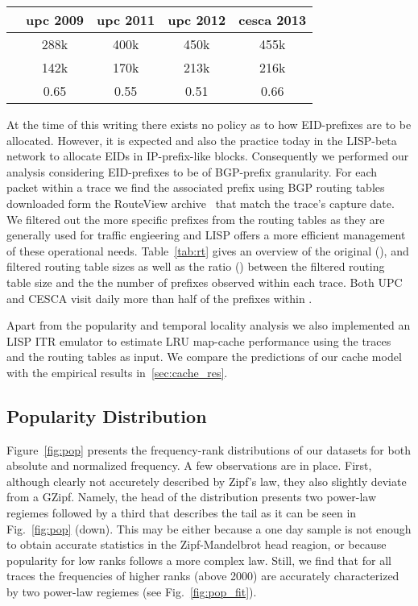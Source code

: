 \documentclass[twocolumn, 10pt]{article}
\theoremstyle{plain}
\begin{document}
\begin{table*}[t]
    \centering
    \caption{Routing Tables Statistics}
    \label{tab:rt}
    \begin{tabular}{lcccc}
        \toprule
        & \textbf{upc 2009} & \textbf{upc 2011} & \textbf{upc 2012} & \textbf{cesca 2013} \\ \midrule[0.09em]
         & 288k & 400k & 450k & 455k \\ \midrule
         & 142k & 170k & 213k & 216k \\ \midrule
         & 0.65 & 0.55 & 0.51 & 0.66 \\
        \bottomrule
    \end{tabular}
\end{table*}

At the time of this writing there exists no policy as to how EID-prefixes are
to be allocated. However, it is expected and also the practice today in the
LISP-beta network to allocate EIDs in IP-prefix-like blocks. Consequently we
performed our analysis considering EID-prefixes to be of BGP-prefix granularity. For each
packet within a trace we find the associated prefix using BGP routing tables
downloaded form the RouteView archive~\cite{routeviews} that match the trace's
capture date. We filtered out the more specific prefixes from the routing
tables as they are generally used for traffic engieering and LISP offers a
more efficient management of these operational needs. Table~\ref{tab:rt} gives
an overview of the original (), and filtered
 routing table sizes as well as the ratio () between the
filtered routing table size and the the number of prefixes observed within
each trace. Both UPC and CESCA visit daily more than half of the prefixes
within . 


Apart from the popularity and temporal locality analysis we also implemented
an LISP ITR emulator to estimate LRU map-cache performance using the traces and
the routing tables as input. We compare the predictions of our
cache model with the empirical results in~\ref{sec:cache_res}.

\subsection{Popularity Distribution}\label{sec:pop_assumption}

Figure~\ref{fig:pop} presents the frequency-rank distributions of our datasets
for both absolute and normalized frequency. A few observations are in
place. First, although clearly not accuretely described by Zipf's law, they
also slightly deviate from a GZipf. Namely, the head of the distribution
presents two power-law regiemes followed by a third that describes the tail as
it can be seen in Fig.~\ref{fig:pop} (down). This may be either
because a one day sample is not enough to obtain accurate statistics in the
Zipf-Mandelbrot head reagion, or because popularity for low ranks follows a
more complex law. Still, we find that for all traces the frequencies of higher
ranks (above 2000) are accurately characterized by two power-law regiemes (see
Fig.~\ref{fig:pop_fit}). 
\end{document}
